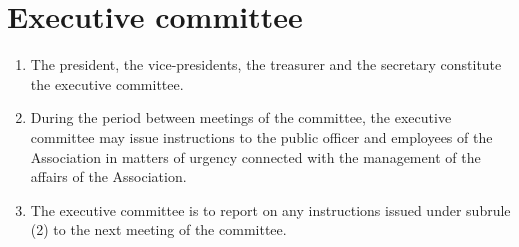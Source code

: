 \documentclass[a4paper,11pt]{article}
\begin{document}
\section{Executive committee}
\begin{enumerate}
	\item The president, the vice-presidents, the treasurer and the secretary constitute the executive committee.
	\item During the period between meetings of the committee, the executive committee may issue instructions to the public officer and employees of the Association in matters of urgency connected with the management of the affairs of the Association.
	\item The executive committee is to report on any instructions issued under subrule (2) to the next meeting of the committee.
\end{enumerate}
\end{document}
